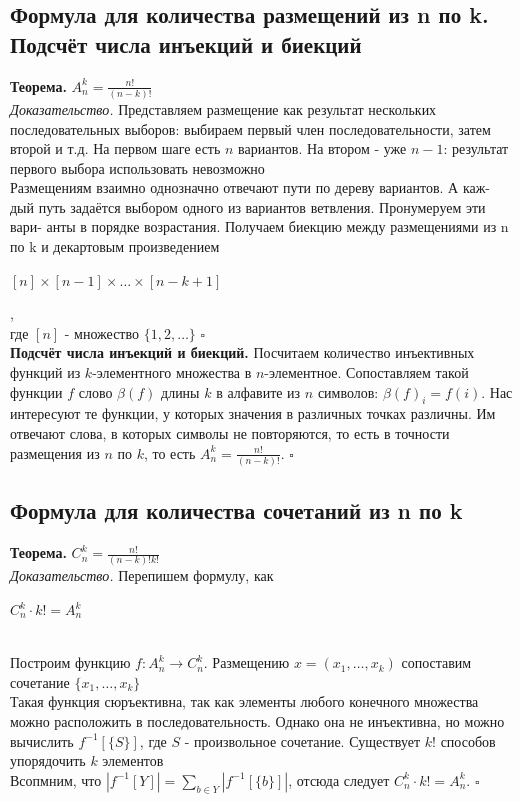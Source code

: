 \documentclass[a4paper]{article}
\newcommand{\qed}{\hfill$\square$}
\begin{document}
\subsection{Формула для количества размещений из n по k. Подсчёт числа инъекций и биекций}
\textbf{Теорема.} $A^k_n=\frac{n!}{(n-k)!}$\\[2mm]
\textit{Доказательство.} Представляем размещение как результат нескольких последовательных выборов: выбираем первый член последовательности, затем второй и т.д. На первом шаге есть $n$ вариантов. На втором - уже $n-1$: результат первого выбора использовать невозможно\\[2mm]
\indent Размещениям взаимно однозначно отвечают пути по дереву вариантов. А каж- дый путь задаётся выбором одного из вариантов ветвления. Пронумеруем эти вари- анты в порядке возрастания. Получаем биекцию между размещениями из n по k и декартовым произведением\\[2mm]
\centerline{$[n]\times[n-1]\times\ldots\times[n-k+1]$},\\[2mm]
где $[n]$ - множество $\{1,2,\ldots\}$ \qed\\[2mm]
\textbf{Подсчёт числа инъекций и биекций.} Посчитаем количество инъективных функций из $k$-элементного множества в $n$-элементное. Сопоставляем такой функции $f$ слово $\beta(f)$ длины $k$ в алфавите из $n$ символов: $\beta(f)_i=f(i)$. Нас интересуют те функции, у которых значения в различных точках различны. Им отвечают слова, в которых символы не повторяются, то есть в точности размещения из $n$ по $k$, то есть $A^k_n=\frac{n!}{(n-k)!}$. \qed
\subsection{Формула для количества сочетаний из n по k}
\textbf{Теорема.} $C_n^k=\frac{n!}{(n-k)!k!}$\\[2mm]
\textit{Доказательство.} Перепишем формулу, как\\
\centerline{$C_n^k\cdot k!=A_n^k$}\\
\indent Построим функцию $f: A_n^k\rightarrow C_n^k$. Размещению $x=(x_1,\ldots,x_k)$ сопоставим сочетание $\{x_1,\ldots,x_k\}$\\[2mm]
\indent Такая функция сюръективна, так как элементы любого конечного множества можно расположить в последовательность. Однако она не инъективна, но можно вычислить $f^{-1}[\{S\}]$, где $S$ - произвольное сочетание. Существует $k!$ способов упорядочить $k$ элементов\\[2mm]
\indent Всопмним, что $|f^{-1}[Y]|=\sum\limits_{b\in Y} |f^{-1}[\{b\}]|$, отсюда следует $C_n^k\cdot k!=A_n^k$. \qed
\end{document}
